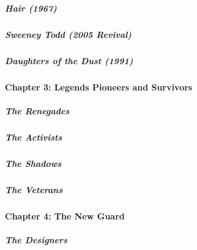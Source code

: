 \href{/interactive/2020/04/13/t-magazine/hair-musical-broadway.html}{}

\hypertarget{hair-1967}{%
\subparagraph{Hair (1967)}\label{hair-1967}}

\href{/interactive/2020/04/13/t-magazine/sweeney-todd-revival.html}{}

\hypertarget{sweeney-todd-2005-revival}{%
\subparagraph{Sweeney Todd (2005
Revival)}\label{sweeney-todd-2005-revival}}

\href{/interactive/2020/04/13/t-magazine/daughters-of-the-dust.html}{}

\hypertarget{daughters-of-the-dust-1991}{%
\subparagraph{Daughters of the Dust
(1991)}\label{daughters-of-the-dust-1991}}

\hypertarget{chapter-3-legends-pioneers-and-survivors}{%
\paragraph{Chapter 3: Legends Pioneers and
Survivors}\label{chapter-3-legends-pioneers-and-survivors}}

\href{/interactive/2020/04/13/t-magazine/butch-stud-lesbian.html}{}

\hypertarget{the-renegades}{%
\subparagraph{The Renegades}\label{the-renegades}}

\href{/interactive/2020/04/13/t-magazine/act-up-aids.html}{}

\hypertarget{the-activists}{%
\subparagraph{The Activists}\label{the-activists}}

\href{/interactive/2020/04/13/t-magazine/artist-recluse.html}{}

\hypertarget{the-shadows}{%
\subparagraph{The Shadows}\label{the-shadows}}

\href{/interactive/2020/04/13/t-magazine/black-actresses-bassett-berry-blige-henson-whitfield-elise.html}{}

\hypertarget{the-veterans}{%
\subparagraph{The Veterans}\label{the-veterans}}

\hypertarget{chapter-4-the-new-guard}{%
\paragraph{Chapter 4: The New Guard}\label{chapter-4-the-new-guard}}

\href{/interactive/2020/04/13/t-magazine/asian-american-fashion-designers.html}{}

\hypertarget{the-designers}{%
\subparagraph{The Designers}\label{the-designers}}

